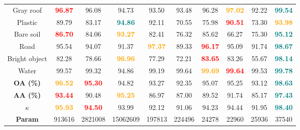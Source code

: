 \begin{table}[ht]
{\begin{tabular}{c|cccccccc|c}
        Gray roof       & \textcolor{red}{\textbf{96.87}} & 96.08 & 94.73 & 93.50 & 93.48 & 96.28 & \textcolor{orange}{\textbf{97.02}} & 92.22 & \textcolor{teal}{\textbf{99.54}} \\ 
        Plastic         & 89.79 & 83.17 &\textcolor{teal}{\textbf{94.86}}  & 92.11  & 70.55 & 75.98 & \textcolor{red}{\textbf{90.51}} & 73.30  & \textcolor{orange}{\textbf{93.98}} \\ 
        Bare soil       & \textcolor{red}{\textbf{86.70}} & 84.06 & \textcolor{orange}{\textbf{93.27}}  & 82.41  & 76.32 & 85.62 & 66.27 & 75.30  & \textcolor{teal}{\textbf{95.12}} \\ 
        Road            & 95.54 &94.07 & 91.37 & \textcolor{orange}{\textbf{97.37}} & 89.33 & \textcolor{red}{\textbf{96.17}} & 95.09 & 91.74  & \textcolor{teal}{\textbf{98.67}} \\ 
        Bright object   & 82.28 & 78.66 & \textcolor{orange}{\textbf{96.96}} & 77.29  & 72.21 & \textcolor{red}{\textbf{83.65}} & 83.26 & 55.67  & \textcolor{teal}{\textbf{98.14}} \\ 
        Water           & 99.57 &99.32 & 94.86 & 99.19  & 99.64 & \textcolor{orange}{\textbf{99.69}} & \textcolor{red}{\textbf{99.64}} & 99.53  & \textcolor{teal}{\textbf{99.78}} \\ \hline
        
        \textbf{OA (\%)}  & \textcolor{orange}{\textbf{96.52}} &\textcolor{red}{\textbf{95.30}} & 94.82 & 93.27  & 92.35 & 95.07 & 95.25 & 93.12  &\textcolor{teal}{\textbf{98.63}} \\ 
        \textbf{AA (\%)}  &\textcolor{red}{\textbf{93.44}} & 90.48 & \textcolor{orange}{\textbf{95.25}} & 86.97  & 87.00 & 89.52 & 91.74 & 85.17  &\textcolor{teal}{\textbf{97.43}} \\ 
        \textbf{$\kappa$}  & \textcolor{orange}{\textbf{95.93}} & \textcolor{red}{\textbf{94.50}} & 93.99 & 92.12 & 91.06 & 94.23 & 94.44 & 91.95  &\textcolor{teal}{\textbf{98.40}} \\ \hline
        \textbf{Param}    & \num{913616} &\num{2821008} & \num{15062609}  & \num{197813} & \num{224496} & \num{24278} & \num{22960} & \num{25936} & \num{37540} \\ \hline
        \end{tabular}}
        \label{tab:HC}
\end{table}









